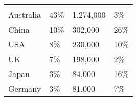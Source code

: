 \begin{tabular}[t]{p{3cm}>{\hfill}p{1.3cm}>{\hfill}p{1.1cm}>{\hfill}p{1.7cm}}
      &   &     &    \\ 
 Australia & 43\% & 1,274,000 & 3\% \\ 
  China & 10\% &   302,000 & 26\% \\ 
  USA & 8\% &   230,000 & 10\% \\ 
  UK & 7\% &   198,000 & 2\% \\ 
  Japan & 3\% &    84,000 & 16\% \\ 
  Germany & 3\% &    81,000 & 7\% \\ 
  \end{tabular}
